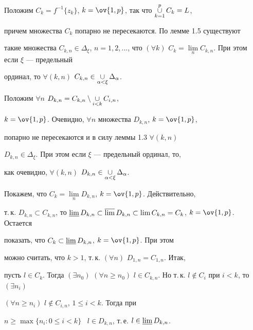 \begin{pf} 


Положим $C_k=f^{-1}\{z_k\}$, $k=\ov{1,p}$, так что $\mathop{\cup}\limits^p_{k=1}C_k=L$, 


причем множества $C_k$ попарно не пересекаются. По лемме 1.5 существуют 


такие множества $C_{k,n}\in\Delta_\xi$, $n=1,2,\dotsc$, что $(\forall k


)$ $C_k=\lim\limits_n C_{k,n}$. При этом если $\xi$ --- предельный 


ординал, то $\forall(k,n)$ $C_{k,n}\in 


\mycup_{\alpha<\xi}\Delta_\alpha$. 


 


Положим $\forall n$ $D_{k,n}=C_{k,n}\setminus \mathop{\cup}\limits_{i<k}C_{i,n}$, 


$k=\ov{1,p}$. Очевидно, $\forall n$ множества $D_{k,n}$, $k=\ov{1,p}$, 


попарно не пересекаются и в силу леммы 1.3 $\forall(k,n)$ 


$D_{k,n}\in\Delta_\xi$. При этом если $\xi$ --- предельный ординал, то, 


как очевидно, $\forall(k,n)$ $D_{k,n}\in 


\mycup_{\alpha<\xi}\Delta_\alpha$. 


 


Покажем, что $C_k=\lim\limits_n D_{k,n}$, $k=\ov{1,p}$. Действительно, 


т.\,к. $D_{k,n}\subset C_{k,n}$, то $\varliminf D_{k,n} \subset 


\varlimsup D_{k,n} \subset \lim C_{k,n}=C_k$, $k=\ov{1,p}$. Остается 


показать, что $C_k\subset \varliminf D_{k,n}$, $k=\ov{1,p}$. При этом 


можно считать, что $k>1$, т.\,к. $(\forall n)$ $D_{1,n}=C_{1,n}$. Итак, 


пусть $l\in C_k$. Тогда $(\exists n_0)$ $(\forall n\ge n_0)$ $l\in 


C_{k,n}$. Но т.\,к. $l\notin C_i$ при $i<k$, то $(\exists n_i)$ 


$(\forall n\ge n_i)$ $l\notin C_{i,n}$, $1\le i<k$. Тогда при 


$n\ge\max\{n_i:0\le i<k\}$ \ $l\in D_{k,n}$, т.\,е. $l\in\varliminf 


D_{k,n}$. 


 



\end{pf}

